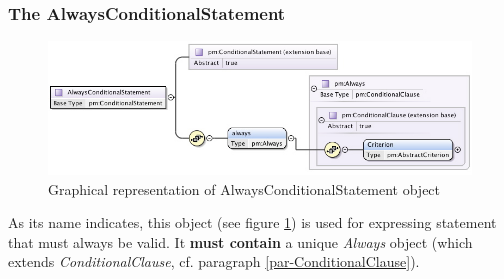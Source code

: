 \documentclass[a4paper,11pt] {ivoa}
\begin{document}
\subsubsection{The AlwaysConditionalStatement}\label{par-AlwaysConditionalStatement}
\begin{figure}[htbp]
\begin{center}
\includegraphics[width=1.1\textwidth]{pictures/AlwaysStatement.jpg} 
\caption{Graphical representation of AlwaysConditionalStatement object}
\label{Pic-AlwaysConditionalStatement}
\end{center}
\end{figure}
As its name indicates, this object (see figure \ref{Pic-AlwaysConditionalStatement}) is used
for expressing statement that must always be valid. It {\bf must contain} a unique {\it Always}
 object (which extends {\it ConditionalClause}, cf. paragraph \ref{par-ConditionalClause}).
\end{document}
